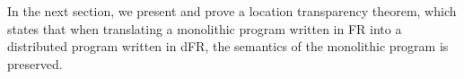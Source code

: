 In the next section, we present and prove a location transparency theorem, which states that when translating a monolithic program written in FR into a distributed program written in dFR, the semantics of the monolithic program is preserved.

        






